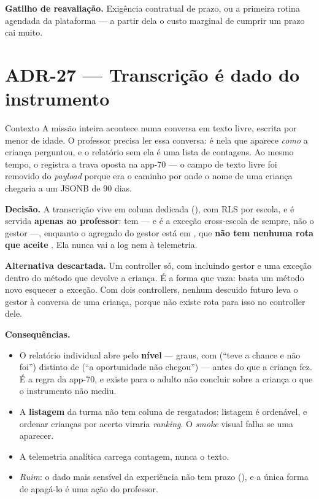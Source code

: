 \textbf{Gatilho de reavaliação.} Exigência contratual de prazo, ou a primeira
rotina agendada da plataforma --- a partir dela o custo marginal de cumprir um
prazo cai muito.

\section{ADR-27 --- Transcrição é dado do instrumento}
\label{adr:transcricao}

\begin{especificacao}{Contexto}
A missão inteira acontece numa conversa em texto livre, escrita por menor de
idade. O professor precisa ler essa conversa: é nela que aparece \emph{como} a
criança perguntou, e o relatório sem ela é uma lista de contagens. Ao mesmo tempo,
o  registra a trava oposta na app-70 --- o campo de texto livre foi
removido do \emph{payload} porque era o caminho por onde o nome de uma criança
chegaria a um JSONB de 90 dias.
\end{especificacao}

\textbf{Decisão.} A transcrição vive em coluna dedicada
(), com RLS por escola, e é servida
\textbf{apenas ao professor}:  tem
 --- e  é a
exceção cross-escola de sempre, não o gestor ---, enquanto o agregado do gestor
está em
, que \textbf{não tem nenhuma rota que aceite
}. Ela nunca vai a log nem à telemetria.

\textbf{Alternativa descartada.} Um controller só, com  incluindo
gestor e uma exceção dentro do método que devolve a criança. É a forma que vaza:
basta um método novo esquecer a exceção. Com dois controllers, nenhum descuido
futuro leva o gestor à conversa de uma criança, porque não existe rota para isso
no controller dele.

\textbf{Consequências.}
\begin{itemize}
  \item O relatório individual abre pelo \textbf{nível} --- graus, com
     (\enquote{teve a chance e não foi}) distinto de  (\enquote{a
    oportunidade não chegou}) --- antes do que a criança fez. É a regra da
    app-70, e existe para o adulto não concluir sobre a criança o que o
    instrumento não mediu.
  \item A \textbf{listagem} da turma não tem coluna de resgatados: listagem é
    ordenável, e ordenar crianças por acerto viraria \emph{ranking}. O
    \emph{smoke} visual falha se uma aparecer.
  \item A telemetria analítica carrega contagem, nunca o texto.
  \item \emph{Ruim}: o dado mais sensível da experiência não tem prazo
    (), e a única forma de apagá-lo é uma ação do professor.
\end{itemize}

